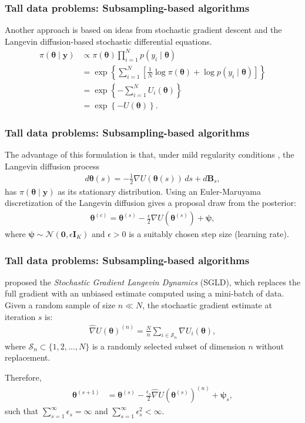 \documentclass[12pt, compress]{beamer}
\begin{document}
\begin{frame}
	\frametitle{Tall data problems: Subsampling-based algorithms}
    Another approach is based on ideas from stochastic gradient descent \cite{robbins1951stochastic} and the Langevin diffusion-based stochastic differential equations.
\begin{align*}
	\pi(\boldsymbol{\theta} \mid \mathbf{y}) &\propto \pi(\boldsymbol{\theta}) \prod_{i=1}^{N} p(y_i \mid \boldsymbol{\theta}) \\
	&= \exp\left\{ \sum_{i=1}^N \left[ \frac{1}{N} \log \pi(\boldsymbol{\theta}) + \log p(y_i \mid \boldsymbol{\theta}) \right] \right\} \\
	&= \exp\left\{ -\sum_{i=1}^N U_i(\boldsymbol{\theta}) \right\} \\
	&= \exp\left\{ -U(\boldsymbol{\theta}) \right\}.
\end{align*} 
\end{frame}

\begin{frame}
	\frametitle{Tall data problems: Subsampling-based algorithms}
The advantage of this formulation is that, under mild regularity conditions \cite{roberts1996exponential}, the Langevin diffusion process
\begin{align*}
	d\boldsymbol{\theta}(s) = -\frac{1}{2} \nabla U(\boldsymbol{\theta}(s))\,ds + d\mathbf{B}_s,
\end{align*}
has \( \pi(\boldsymbol{\theta} \mid \mathbf{y}) \) as its stationary distribution. 
Using an Euler-Maruyama discretization of the Langevin diffusion gives a proposal draw from the posterior:
\begin{align*}
	\boldsymbol{\theta}^{(c)} = \boldsymbol{\theta}^{(s)} - \frac{\epsilon}{2} \nabla U(\boldsymbol{\theta}^{(s)}) + \boldsymbol{\psi},
\end{align*}
where \( \boldsymbol{\psi} \sim \mathcal{N}(\mathbf{0}, \epsilon \mathbf{I}_K) \) and \( \epsilon > 0 \) is a suitably chosen step size (learning rate).
\end{frame}

\begin{frame}
	\frametitle{Tall data problems: Subsampling-based algorithms}
\cite{welling2011bayesian} proposed the \textit{Stochastic Gradient Langevin Dynamics} (SGLD), which replaces the full gradient with an unbiased estimate computed using a mini-batch of data. Given a random sample of size \( n \ll N \), the stochastic gradient estimate at iteration \( s \) is:
\begin{align} \label{eq:grad}
	\hat{\nabla} U(\boldsymbol{\theta})^{(n)} = \frac{N}{n} \sum_{i \in \mathcal{S}_n} \nabla U_i(\boldsymbol{\theta}),
\end{align}
where \( \mathcal{S}_n \subset \{1, 2, \dots, N\} \) is a randomly selected subset of dimension $n$ without replacement.

Therefore, 
\begin{align*}
	\boldsymbol{\theta}^{(s+1)}&= \boldsymbol{\theta}^{(s)} -\frac{\epsilon_s}{2}\hat{\nabla} U(\boldsymbol{\theta}^{(s)})^{(n)}+\boldsymbol{\psi}_s,
\end{align*}
such that $\sum_{s=1}^{\infty}\epsilon_s=\infty$ and $\sum_{s=1}^{\infty}\epsilon_s^2<\infty$.
\end{frame}
\end{document}

